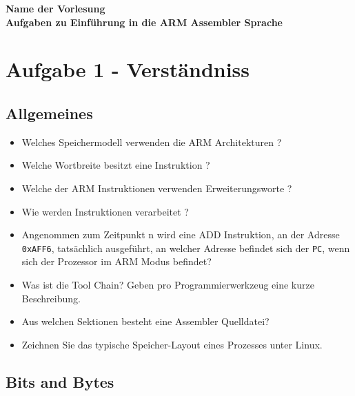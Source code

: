 \documentclass[12pt]{article}
\begin{document}
\begin{center}
  \textbf{\LARGE Name der Vorlesung} \\[1ex]%
  \textbf{\Large Aufgaben zu Einführung in die ARM Assembler Sprache}\\[2ex] %
  
\end{center}

\section{Aufgabe 1 - Verständniss}

\subsection{Allgemeines}

\begin{itemize}
 \item Welches Speichermodell verwenden die ARM Architekturen ?
 \item Welche Wortbreite besitzt eine Instruktion ?
 \item Welche der ARM Instruktionen verwenden Erweiterungsworte ?
 \item Wie werden Instruktionen verarbeitet ?
 \item Angenommen zum Zeitpunkt n wird eine ADD Instruktion, an der Adresse
     \texttt{0xAFF6}, tatsächlich ausgeführt, an welcher Adresse befindet sich
        der \texttt{PC}, wenn sich der Prozessor im ARM Modus befindet?
 \item Was ist die Tool Chain? Geben pro Programmierwerkzeug eine kurze
     Beschreibung.
 \item Aus welchen Sektionen besteht eine Assembler Quelldatei?
 \item Zeichnen Sie das typische Speicher-Layout eines Prozesses unter Linux.
\end{itemize}

\subsection{Bits and Bytes}
\end{document}
